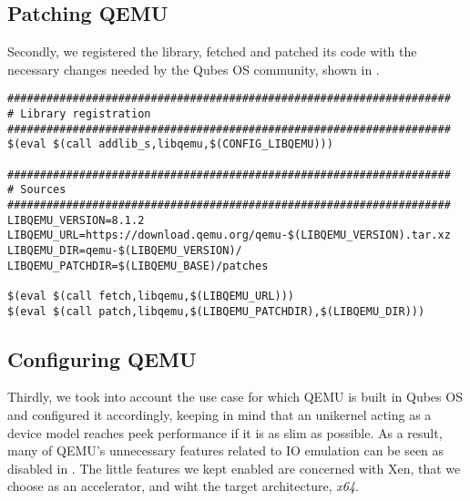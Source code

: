 \subsection{Patching QEMU}
\label{subsec:patching-qemu}

Secondly, we registered the library, fetched and patched its code with the necessary changes needed by the Qubes OS community, shown in .

\begin{lstlisting}
####################################################################
# Library registration
####################################################################
$(eval $(call addlib_s,libqemu,$(CONFIG_LIBQEMU)))
    
####################################################################
# Sources
####################################################################
LIBQEMU_VERSION=8.1.2
LIBQEMU_URL=https://download.qemu.org/qemu-$(LIBQEMU_VERSION).tar.xz
LIBQEMU_DIR=qemu-$(LIBQEMU_VERSION)/
LIBQEMU_PATCHDIR=$(LIBQEMU_BASE)/patches
    
$(eval $(call fetch,libqemu,$(LIBQEMU_URL)))
$(eval $(call patch,libqemu,$(LIBQEMU_PATCHDIR),$(LIBQEMU_DIR)))
\end{lstlisting}

\subsection{Configuring QEMU}
\label{subsec:configuring-qemu}

Thirdly, we took into account the use case for which QEMU is built in Qubes OS and configured it accordingly, keeping in mind that an unikernel acting as a device model reaches peek performance if it is as slim as possible.
As a result, many of QEMU's unnecessary features related to IO emulation can be seen as disabled in .
The little features we kept enabled are concerned with Xen, that we choose as an accelerator, and wiht the target architecture, \textit{x64}. 

